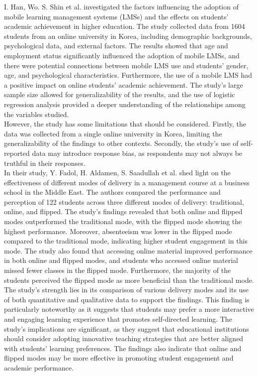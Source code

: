 I. Han, Wo. S. Shin et al. investigated the factors influencing the adoption of mobile learning management systems (LMSs) and the effects on students' academic achievement in higher education. The study collected data from 1604 students from an online university in Korea, including demographic backgrounds, psychological data, and external factors. The results showed that age and employment status significantly influenced the adoption of mobile LMSs, and there were potential connections between mobile LMS use and students' gender, age, and psychological characteristics. Furthermore, the use of a mobile LMS had a positive impact on online students' academic achievement. The study's large sample size allowed for generalizability of the results, and the use of logistic regression analysis provided a deeper understanding of the relationships among the variables studied.\\

However, the study has some limitations that should be considered. Firstly, the data was collected from a single online university in Korea, limiting the generalizability of the findings to other contexts. Secondly, the study's use of self-reported data may introduce response bias, as respondents may not always be truthful in their responses.\cite{han2016use} \\

In their study, Y. Fadol, H. Aldamen, S. Saadullah et al. shed light on the effectiveness of different modes of delivery in a management course at a business school in the Middle East. The authors compared the performance and perception of 122 students across three different modes of delivery: traditional, online, and flipped. The study's findings revealed that both online and flipped modes outperformed the traditional mode, with the flipped mode showing the highest performance. Moreover, absenteeism was lower in the flipped mode compared to the traditional mode, indicating higher student engagement in this mode. The study also found that accessing online material improved performance in both online and flipped modes, and students who accessed online material missed fewer classes in the flipped mode. Furthermore, the majority of the students perceived the flipped mode as more beneficial than the traditional mode. The study's strength lies in its comparison of various delivery modes and its use of both quantitative and qualitative data to support the findings. This finding is particularly noteworthy as it suggests that students may prefer a more interactive and engaging learning experience that promotes self-directed learning. The study's implications are significant, as they suggest that educational institutions should consider adopting innovative teaching strategies that are better aligned with students' learning preferences. The findings also indicate that online and flipped modes may be more effective in promoting student engagement and academic performance.\\

